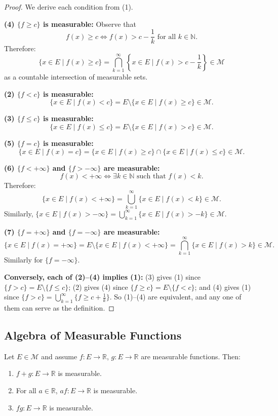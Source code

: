 \documentclass[11pt]{report}
\begin{document}
\begin{proof}
We derive each condition from (1).

\textbf{(4) $\{f \geq c\}$ is measurable:} Observe that
\[
f(x) \geq c \iff f(x) > c - \frac{1}{k} \text{ for all } k \in \mathbb{N}.
\]
Therefore:
\[
\{x \in E \mid f(x) \geq c\} = \bigcap_{k=1}^{\infty} \left\{x \in E \mid f(x) > c - \frac{1}{k}\right\} \in \mathcal{M}
\]
as a countable intersection of measurable sets.

\textbf{(2) $\{f < c\}$ is measurable:}
\[
\{x \in E \mid f(x) < c\} = E \setminus \{x \in E \mid f(x) \geq c\} \in \mathcal{M}.
\]

\textbf{(3) $\{f \leq c\}$ is measurable:}
\[
\{x \in E \mid f(x) \leq c\} = E \setminus \{x \in E \mid f(x) > c\} \in \mathcal{M}.
\]

\textbf{(5) $\{f = c\}$ is measurable:}
\[
\{x \in E \mid f(x) = c\} = \{x \in E \mid f(x) \geq c\} \cap \{x \in E \mid f(x) \leq c\} \in \mathcal{M}.
\]

\textbf{(6) $\{f < +\infty\}$ and $\{f > -\infty\}$ are measurable:}
\[
f(x) < +\infty \iff \exists k \in \mathbb{N} \text{ such that } f(x) < k.
\]
Therefore:
\[
\{x \in E \mid f(x) < +\infty\} = \bigcup_{k=1}^{\infty} \{x \in E \mid f(x) < k\} \in \mathcal{M}.
\]
Similarly, $\{x \in E \mid f(x) > -\infty\} = \bigcup_{k=1}^{\infty} \{x \in E \mid f(x) > -k\} \in \mathcal{M}$.

\textbf{(7) $\{f = +\infty\}$ and $\{f = -\infty\}$ are measurable:}
\[
\{x \in E \mid f(x) = +\infty\} = E \setminus \{x \in E \mid f(x) < +\infty\} = \bigcap_{k=1}^{\infty} \{x \in E \mid f(x) > k\} \in \mathcal{M}.
\]
Similarly for $\{f = -\infty\}$.

\textbf{Conversely, each of (2)--(4) implies (1):} (3) gives (1) since $\{f > c\} = E \setminus \{f \leq c\}$; (2) gives (4) since $\{f \geq c\} = E \setminus \{f < c\}$; and (4) gives (1) since $\{f > c\} = \bigcup_{k=1}^{\infty} \{f \geq c + \frac{1}{k}\}$. So (1)--(4) are equivalent, and any one of them can serve as the definition.
\end{proof}

\subsection{Algebra of Measurable Functions}

\begin{thmbox}
Let $E \in \mathcal{M}$ and assume $f: E \to \mathbb{R}$, $g: E \to \mathbb{R}$ are measurable functions. Then:
\begin{enumerate}
    \item $f + g: E \to \mathbb{R}$ is measurable.
    \item For all $a \in \mathbb{R}$, $af: E \to \mathbb{R}$ is measurable.
    \item $fg: E \to \mathbb{R}$ is measurable.
\end{enumerate}
\end{thmbox}
\end{document}

